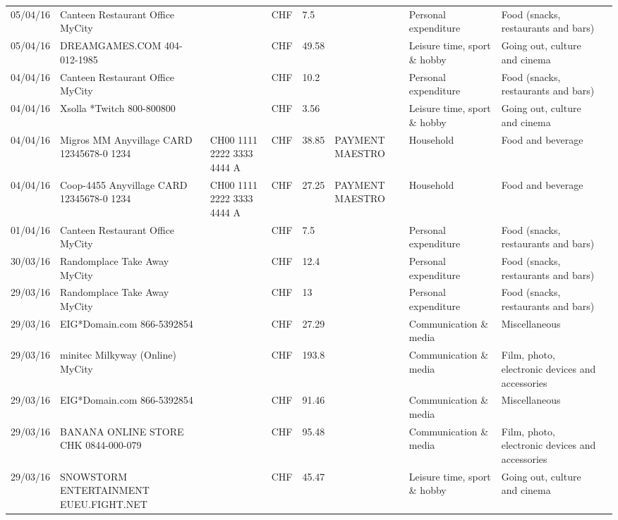 \begin{landscape}
\begin{tiny}
\begin{longtable}{lp{4cm}llllp{3cm}ll}
		    05/04/16 & Canteen Restaurant Office      MyCity &       & CHF   & 7.5   &       & Personal expenditure & Food (snacks, restaurants and bars) \\
		    05/04/16 & DREAMGAMES.COM           404-012-1985 &       & CHF   & 49.58 &       & Leisure time, sport \& hobby & Going out, culture and cinema \\
		    04/04/16 & Canteen Restaurant Office      MyCity &       & CHF   & 10.2  &       & Personal expenditure & Food (snacks, restaurants and bars) \\
		    04/04/16 & Xsolla *Twitch           800-800800 &       & CHF   & 3.56  &       & Leisure time, sport \& hobby & Going out, culture and cinema \\
		    04/04/16 & Migros MM Anyvillage CARD 12345678-0 1234 & CH00 1111 2222 3333 4444 A & CHF   & 38.85 & PAYMENT MAESTRO & Household & Food and beverage \\
		    04/04/16 & Coop-4455 Anyvillage CARD 12345678-0 1234 & CH00 1111 2222 3333 4444 A & CHF   & 27.25 & PAYMENT MAESTRO & Household & Food and beverage \\
		    01/04/16 & Canteen Restaurant Office      MyCity &       & CHF   & 7.5   &       & Personal expenditure & Food (snacks, restaurants and bars) \\
		    30/03/16 & Randomplace Take Away     MyCity &       & CHF   & 12.4  &       & Personal expenditure & Food (snacks, restaurants and bars) \\
		    29/03/16 & Randomplace Take Away     MyCity &       & CHF   & 13    &       & Personal expenditure & Food (snacks, restaurants and bars) \\
		    29/03/16 & EIG*Domain.com           866-5392854 &       & CHF   & 27.29 &       & Communication \& media & Miscellaneous \\
		    29/03/16 & minitec Milkyway (Online) MyCity &       & CHF   & 193.8 &       & Communication \& media & Film, photo, electronic devices and accessories \\
		    29/03/16 & EIG*Domain.com           866-5392854 &       & CHF   & 91.46 &       & Communication \& media & Miscellaneous \\
		    29/03/16 & BANANA ONLINE STORE CHK   0844-000-079 &       & CHF   & 95.48 &       & Communication \& media & Film, photo, electronic devices and accessories \\
		    29/03/16 & SNOWSTORM ENTERTAINMENT EUEU.FIGHT.NET &       & CHF   & 45.47 &       & Leisure time, sport \& hobby & Going out, culture and cinema \\

\end{longtable}
\end{tiny}
\end{landscape}
